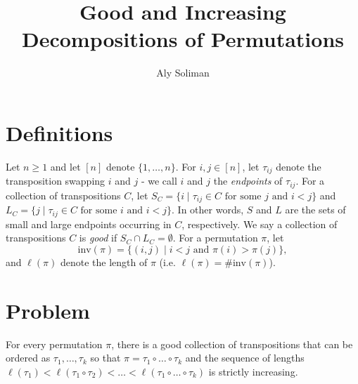 \documentclass[psamsfonts]{amsart}
\theoremstyle{definition}
\theoremstyle{remark}
\numberwithin{equation}{section}
\begin{document}
\title{Good and Increasing Decompositions of  Permutations}

\author{Aly Soliman}

\maketitle
\section{Definitions}
Let $n\geq 1$ and let $[n]$ denote $\{1,\ldots,n\}$. For $i,j\in [n]$, let $\tau_{ij}$ denote the transposition swapping $i$ and $j$ - we call $i$ and $j$ the \textit{endpoints} of $\tau_{ij}$. For a collection of transpositions $C$, let $S_C=\{i\mid \tau_{ij}\in C \text{ for some }j\text{ and }i<j\}$ and $L_C=\{j\mid \tau_{ij}\in C \text{ for some }i\text{ and }i<j\}$. In other words, $S$ and $L$ are the sets of small and large endpoints occurring in $C$, respectively. We say a collection of transpositions $C$ is \textit{good} if $S_C\cap L_C=\emptyset$. For a permutation $\pi$, let
\[\text{inv}(\pi)=\{(i,j)\mid i < j\text{ and } \pi(i)>\pi(j)\},\]
and
 $\ell(\pi)$ denote the length of $\pi$ (i.e. $\ell(\pi)=\#\text{inv}(\pi)$).
\section{Problem}
For every permutation $\pi$, there is a good collection of transpositions that can be ordered as $\tau_1,\ldots,\tau_k$ so that $\pi=\tau_1\circ\ldots\circ\tau_k$ and the sequence of lengths $\ell(\tau_1)<\ell(\tau_1\circ\tau_2)<\ldots<\ell(\tau_1\circ\ldots\circ\tau_k)$ is strictly increasing.
\end{document}
